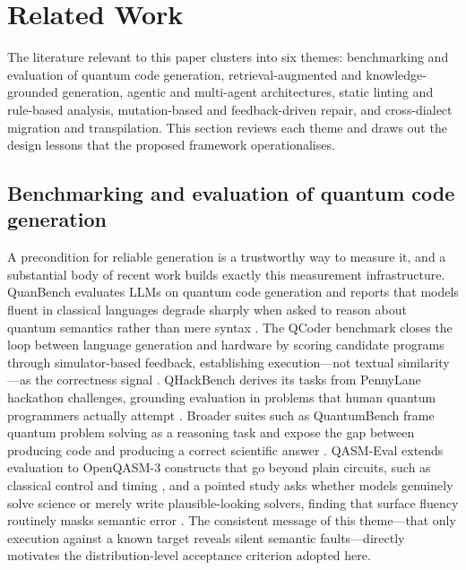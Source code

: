 \documentclass[11pt,a4paper]{article}
\begin{document}
\section{Related Work}
\label{sec:related}

The literature relevant to this paper clusters into six themes: benchmarking and evaluation of quantum code generation, retrieval-augmented and knowledge-grounded generation, agentic and multi-agent architectures, static linting and rule-based analysis, mutation-based and feedback-driven repair, and cross-dialect migration and transpilation. This section reviews each theme and draws out the design lessons that the proposed framework operationalises.

\subsection{Benchmarking and evaluation of quantum code generation}
A precondition for reliable generation is a trustworthy way to measure it, and a substantial body of recent work builds exactly this measurement infrastructure. QuanBench evaluates LLMs on quantum code generation and reports that models fluent in classical languages degrade sharply when asked to reason about quantum semantics rather than mere syntax \cite{ref22}. The QCoder benchmark closes the loop between language generation and hardware by scoring candidate programs through simulator-based feedback, establishing execution---not textual similarity---as the correctness signal \cite{ref21}. QHackBench derives its tasks from PennyLane hackathon challenges, grounding evaluation in problems that human quantum programmers actually attempt \cite{ref30}. Broader suites such as QuantumBench frame quantum problem solving as a reasoning task and expose the gap between producing code and producing a correct scientific answer \cite{ref20}. QASM-Eval extends evaluation to OpenQASM-3 constructs that go beyond plain circuits, such as classical control and timing \cite{ref4}, and a pointed study asks whether models genuinely solve science or merely write plausible-looking solvers, finding that surface fluency routinely masks semantic error \cite{ref6}. The consistent message of this theme---that only execution against a known target reveals silent semantic faults---directly motivates the distribution-level acceptance criterion adopted here.
\end{document}
